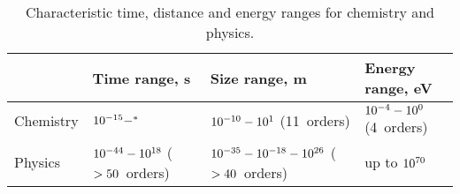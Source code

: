 \begin{table}[h!]
\addtocounter{totaltables}{1}
\caption{Characteristic time, distance and energy ranges for chemistry and physics.}
\label{table:Ranges}
\centering

\begin{tabular}{|x{2cm}|>{\centering\arraybackslash}x{2.5cm}|>{\centering\arraybackslash}x{3.7cm}|>{\centering\arraybackslash}x{3.1cm}|}

\hline  
&  Time range, s&  Size range, m&  Energy range, eV\\ 
\hline  
Chemistry&  $\rm 10^{-15} - ^*$& $\rm 10^{-10} -10^{1}$  (11~orders) & $\rm 10^{-4} -10^{0}$ (4~orders) \\
 
\hline  

Physics&  $\rm 10^{-44} -10^{18}$ ($\rm >50$~orders)& $\rm 10^{-35}-10^{-18} -10^{26}$ ($\rm >40$~orders) & up to $\rm 10^{70}$ \\
 
\hline 
\end{tabular} 
\end{table}